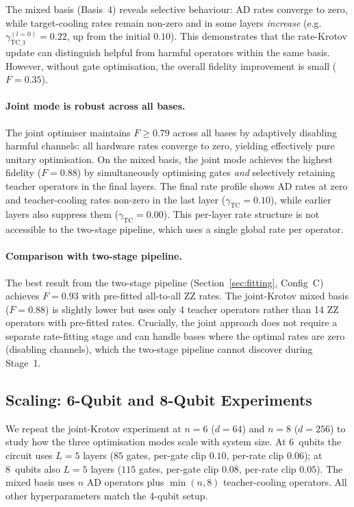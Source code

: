 \documentclass[11pt,a4paper]{article}
\begin{document}
The mixed basis (Basis~4) reveals selective behaviour:
AD rates converge to zero, while target-cooling rates remain non-zero
and in some layers \emph{increase} (e.g.\ $\gamma_\text{TC\_1}^{(l=0)} = 0.22$,
up from the initial $0.10$).  This demonstrates that the rate-Krotov
update can distinguish helpful from harmful operators within the same
basis.  However, without gate optimisation, the overall fidelity
improvement is small ($F = 0.35$).

\paragraph{Joint mode is robust across all bases.}
The joint optimiser maintains $F \ge 0.79$ across all bases by adaptively
disabling harmful channels: all hardware rates converge to zero, yielding
effectively pure unitary optimisation.  On the mixed basis, the joint
mode achieves the highest fidelity ($F = 0.88$) by simultaneously
optimising gates \emph{and} selectively retaining teacher operators in
the final layers.  The final rate profile shows AD rates at zero and
teacher-cooling rates non-zero in the last layer
($\gamma_\text{TC} = 0.10$), while earlier layers also suppress them
($\gamma_\text{TC} = 0.00$).  This per-layer rate structure is not
accessible to the two-stage pipeline, which uses a single global rate
per operator.

\paragraph{Comparison with two-stage pipeline.}
The best result from the two-stage pipeline (Section~\ref{sec:fitting},
Config~C) achieves $F = 0.93$ with pre-fitted all-to-all ZZ rates.
The joint-Krotov mixed basis ($F = 0.88$) is slightly lower but uses
only 4 teacher operators rather than 14 ZZ operators with pre-fitted
rates.  Crucially, the joint approach does not require a separate
rate-fitting stage and can handle bases where the optimal rates are
zero (disabling channels), which the two-stage pipeline cannot
discover during Stage~1.


\subsection{Scaling: 6-Qubit and 8-Qubit Experiments}
\label{sec:scaling_rate_krotov}

We repeat the joint-Krotov experiment at $n = 6$ ($d = 64$) and
$n = 8$ ($d = 256$) to study how the three optimisation modes scale
with system size.  At 6~qubits the circuit uses $L = 5$ layers
($85$ gates, per-gate clip $0.10$, per-rate clip $0.06$); at 8~qubits
also $L = 5$ layers ($115$ gates, per-gate clip $0.08$, per-rate clip
$0.05$).  The mixed basis uses $n$ AD operators plus
$\min(n, 8)$ teacher-cooling operators.  All other hyperparameters
match the 4-qubit setup.
\end{document}
